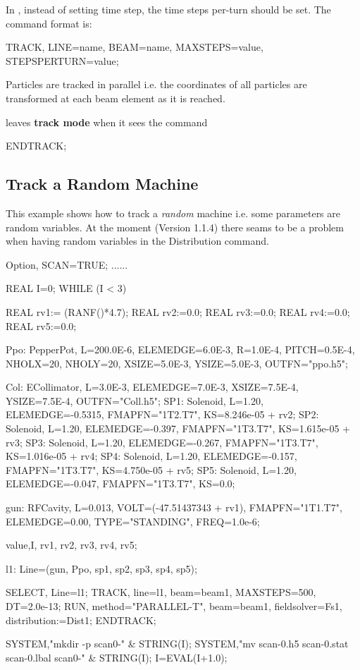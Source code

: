 
In \opalcycl, instead of setting time step, the time steps per-turn should be set.
The command format is:
\begin{example}
TRACK, LINE=name, BEAM=name, MAXSTEPS=value,  STEPSPERTURN=value;
\end{example}

Particles are tracked in parallel i.e. the coordinates of all particles
are transformed at each beam element as it is reached.

\opal leaves \textbf{track mode} when it sees the command
\begin{example}
  ENDTRACK;
\end{example}




\subsection{Track a Random Machine} \label{sec:randmach}
This example shows how to track a {\em random} machine i.e. some
parameters are random variables. At the moment (Version 1.1.4) there seams to be a problem when
having random variables in the Distribution command.
\begin{example}
Option, SCAN=TRUE;
......

REAL I=0;
WHILE (I < 3) {

   REAL rv1:= (RANF()*4.7);
   REAL rv2:=0.0;
   REAL rv3:=0.0;
   REAL rv4:=0.0;
   REAL rv5:=0.0;

   Ppo: PepperPot, L=200.0E-6, ELEMEDGE=6.0E-3,
        R=1.0E-4, PITCH=0.5E-4, NHOLX=20, NHOLY=20,
        XSIZE=5.0E-3, YSIZE=5.0E-3, OUTFN="ppo.h5";

   Col: ECollimator, L=3.0E-3, ELEMEDGE=7.0E-3,
        XSIZE=7.5E-4, YSIZE=7.5E-4, OUTFN="Coll.h5";
   SP1: Solenoid, L=1.20, ELEMEDGE=-0.5315,
        FMAPFN="1T2.T7", KS=8.246e-05 + rv2;
   SP2: Solenoid, L=1.20, ELEMEDGE=-0.397,
        FMAPFN="1T3.T7", KS=1.615e-05 + rv3;
   SP3: Solenoid, L=1.20, ELEMEDGE=-0.267,
        FMAPFN="1T3.T7", KS=1.016e-05 + rv4;
   SP4: Solenoid, L=1.20, ELEMEDGE=-0.157,
        FMAPFN="1T3.T7", KS=4.750e-05 + rv5;
   SP5: Solenoid, L=1.20, ELEMEDGE=-0.047,
        FMAPFN="1T3.T7", KS=0.0;

   gun: RFCavity, L=0.013, VOLT=(-47.51437343 + rv1),
        FMAPFN="1T1.T7", ELEMEDGE=0.00,
        TYPE="STANDING", FREQ=1.0e-6;

   value,{I, rv1, rv2, rv3, rv4, rv5};

   l1: Line=(gun, Ppo, sp1, sp2, sp3, sp4, sp5);

   SELECT, Line=l1;
   TRACK, line=l1, beam=beam1, MAXSTEPS=500, DT=2.0e-13;
    RUN, method="PARALLEL-T", beam=beam1,
    fieldsolver=Fs1, distribution:=Dist1;
   ENDTRACK;

   SYSTEM,"mkdir -p scan0-" & STRING(I);
   SYSTEM,"mv scan-0.h5 scan-0.stat scan-0.lbal scan0-"
          & STRING(I);
   I=EVAL(I+1.0);
}
\end{example}


